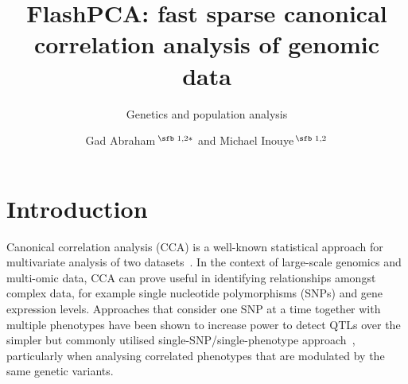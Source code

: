 \documentclass{bioinfo}
\begin{document}

\subtitle{Genetics and population analysis}

\title[Fast SCCA]{FlashPCA: fast sparse canonical correlation analysis of genomic data}
\author[Sample \textit{et~al}.]{Gad Abraham\,$^{\text{\sfb 1,2}*}$
and Michael Inouye\,$^{\text{\sfb 1,2}}$}
\address{$^{\text{\sf 1}}$ Centre for Systems Genomics, School of
BioSciences, University of Melbourne, Parkville 3010, VIC, Australia. \\
$^{\text{\sf 2}}$ Department of Pathology, Faculty of Medicine, Dentistry, and
Health Sciences, University of Melbourne,\\ Parkville 3010, VIC, Australia.}





\maketitle

\section{Introduction}

Canonical correlation analysis (CCA) is a well-known statistical approach for
multivariate analysis of two datasets~\citep{Hotelling1936}. In the context of
large-scale genomics and multi-omic data, CCA can prove useful in identifying
relationships amongst complex data, for example single nucleotide polymorphisms
(SNPs) and gene expression levels. Approaches that consider one SNP at a time
together with multiple phenotypes have been shown to increase power to detect
QTLs over the simpler but commonly utilised single-SNP/single-phenotype
approach~\citep{Ferreira2009,Inouye2012}, particularly when analysing
correlated phenotypes that are modulated by the same genetic variants.
\end{document}

